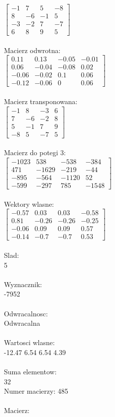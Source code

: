 \documentclass[a4paper,12pt]{article}
\begin{document}
$\begin{bmatrix} -1&7&5&-8\\8&-6&-1&5\\-3&-2&7&-7\\6&8&9&5 \end{bmatrix}$
\\
\\
Macierz odwrotna:\\

$\begin{bmatrix} 0.11&0.13&-0.05&-0.01\\0.06&-0.04&-0.08&0.02\\-0.06&-0.02&0.1&0.06\\-0.12&-0.06&0&0.06 \end{bmatrix}$
\\
\\
Macierz transponowana:\\

$\begin{bmatrix} -1&8&-3&6\\7&-6&-2&8\\5&-1&7&9\\-8&5&-7&5 \end{bmatrix}$
\\
\\
Macierz do potegi 3:\\

$\begin{bmatrix} -1023&538&-538&-384\\471&-1629&-219&-44\\-895&-564&-1120&52\\-599&-297&785&-1548 \end{bmatrix}$
\\
\\
Wektory wlasne:\\

$\begin{bmatrix} -0.57&0.03&0.03&-0.58\\0.81&-0.26&-0.26&-0.25\\-0.06&0.09&0.09&0.57\\-0.14&-0.7&-0.7&0.53 \end{bmatrix}$
\\
\\
Slad:\\
5
\\
\\
Wyznacznik:\\
-7952
\\
\\
Odwracalnosc:\\
Odwracalna
\\
\\
Wartosci wlasne:\\
-12.47 6.54 6.54 4.39
\\
\\
Suma elementow:\\
32
\\
\newpage
Numer macierzy:
485
\\
\\
Macierz:\\
\end{document}
